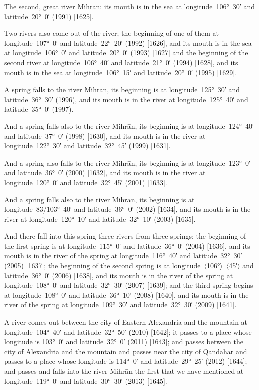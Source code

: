 \documentclass[11pt]{article}
\newcommand{\Pg}[1]{\marginpar{\footnotesize #1}}
\newcommand{\Ang}[1]{\ensuremath{#1}}
\begin{document}
The second, great river Mihrān: its mouth is in the sea at longitude~106°~30′ and latitude~20°~0′ (1991) [1625].

Two rivers also come out of the river; the beginning of one of them at longitude~107°~0′ and latitude~22°~20′ (1992) [1626], and its mouth is in the sea at longitude~106°~0′ and latitude~20°~0′ (1993) [1627] and the beginning of the second river at longitude~106°~40′ and latitude~21°~0′ (1994) [1628], and its mouth is in the sea at longitude~106°~15′ and latitude~20°~0′ (1995) [1629].

A spring falls to the river Mihrān, its beginning is at longitude~125°~30′ and latitude~36°~30′ (1996)\Pg{p. 132}, and its mouth is in the river at longitude~125°~40′ and latitude~35°~0′ (1997).

And a spring falls also to the river Mihrān, its beginning is at longitude~124°~40′ and latitude~37°~0′ (1998) [1630], and its mouth is in the river at longitude~122°~30′ and latitude~32°~45′ (1999) [1631].

And a spring also falls to the river Mihrān, its beginning is at longitude~123°~0′ and latitude~36°~0′ (2000) [1632], and its mouth is in the river at longitude~120°~0′ and latitude~32°~45′ (2001) [1633].

And a spring falls also to the river Mihrān, its beginning is at longitude~83/103°~40′ and latitude~36°~0′ (2002) [1634], and its mouth is in the river at longitude~120°~10′ and latitude~32°~10′ (2003) [1635].

And there fall into this spring three rivers from three springs: the beginning of the first spring is at longitude~115°~0′ and latitude~36°~0′ (2004) [1636], and its mouth is in the river of the spring at longitude~116°~40′ and latitude~32°~30′ (2005) [1637]; the beginning of the second spring is at longitude~\Ang{\langle}106°\Ang{\rangle}~\Ang{\langle}45′\Ang{\rangle} and latitude~36°~0′ (2006) [1638], and its mouth is in the river of the spring at longitude~108°~0′ and latitude~32°~30′ (2007) [1639]; and the third spring begins at longitude~108°~0′ and latitude~36°~10′ (2008) [1640], and its mouth is in the river of the spring at longitude~109°~30′ and latitude~32°~30′ (2009) [1641].

A river comes out between the city of Eastern Alexandria and the mountain at longitude~104°~40′ and latitude~32°~50′ (2010) [1642]; it passes to a place whose longitude is 103°~0′ and latitude~32°~0′ (2011) [1643]\Pg{p. 133}; and passes between the city of Alexandria and the mountain and passes near the city of Qandahār and passes to a place whose longitude is 114°~0′ and latitude~29°~25′ (2012) [1644]; and passes and falls into the river Mihrān the first that we have mentioned at longitude~119°~0′ and latitude~30°~30′ (2013) [1645].
\end{document}
